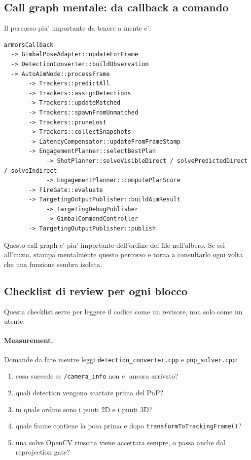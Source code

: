 \documentclass[11pt,a4paper]{article}
\newcommand{\code}[1]{\texttt{#1}}
\newcommand{\topic}[1]{\texttt{#1}}
\begin{document}
\subsection{Call graph mentale: da callback a comando}

Il percorso piu' importante da tenere a mente e':
\begin{lstlisting}[style=shellstyle,caption={Call graph semplificato per leggere il runtime}]
armorsCallback
  -> GimbalPoseAdapter::updateForFrame
  -> DetectionConverter::buildObservation
  -> AutoAimNode::processFrame
       -> Trackers::predictAll
       -> Trackers::assignDetections
       -> Trackers::updateMatched
       -> Trackers::spawnFromUnmatched
       -> Trackers::pruneLost
       -> Trackers::collectSnapshots
       -> LatencyCompensator::updateFromFrameStamp
       -> EngagementPlanner::selectBestPlan
            -> ShotPlanner::solveVisibleDirect / solvePredictedDirect / solveIndirect
            -> EngagementPlanner::computePlanScore
       -> FireGate::evaluate
       -> TargetingOutputPublisher::buildAimResult
            -> TargetingDebugPublisher
            -> GimbalCommandController
       -> TargetingOutputPublisher::publish
\end{lstlisting}

Questo call graph e' piu' importante dell'ordine dei file nell'albero. Se sei all'inizio, stampa mentalmente questo percorso e torna a consultarlo ogni volta che una funzione sembra isolata.

\subsection{Checklist di review per ogni blocco}

Questa checklist serve per leggere il codice come un revisore, non solo come un utente.

\paragraph{Measurement.}
Domande da fare mentre leggi \code{detection\_converter.cpp} e \code{pnp\_solver.cpp}:
\begin{enumerate}[leftmargin=1.4em]
  \item cosa succede se \topic{/camera_info} non e' ancora arrivato?
  \item quali detection vengono scartate prima del PnP?
  \item in quale ordine sono i punti 2D e i punti 3D?
  \item quale frame contiene la posa prima e dopo \code{transformToTrackingFrame()}?
  \item una solve OpenCV riuscita viene accettata sempre, o passa anche dal reprojection gate?
\end{enumerate}
\end{document}
